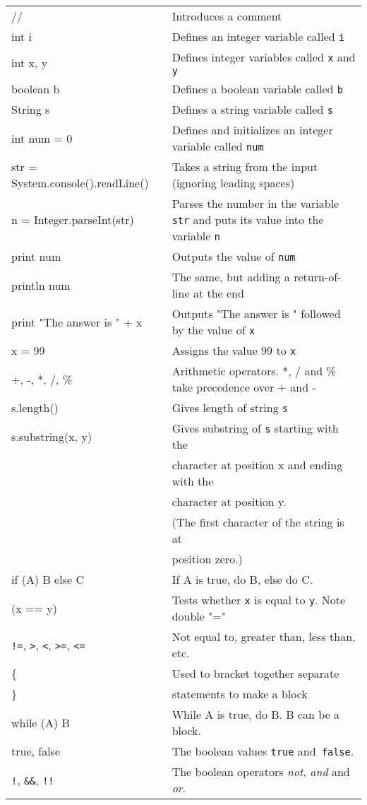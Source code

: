 
\begin{tabular}{p{6cm}p{7cm}}
// & Introduces a comment\\
int i & Defines an integer variable called \texttt{i}\\
int x, y & Defines integer variables called \texttt{x} and \texttt{y}\\
boolean b & Defines a boolean variable called \texttt{b}\\
String s & Defines a string variable called \texttt{s}\\
int num = 0 & Defines and initializes an integer variable called \texttt{num}\\
str = System.console().readLine() & Takes a string from the input
(ignoring leading spaces) \\
n = Integer.parseInt(str) & Parses the number in the variable
\texttt{str} and puts its value into the variable \texttt{n} \\
print num & Outputs the value of \texttt{num}\\
println num & The same, but adding a return-of-line at the end\\
print "The answer is " + x & Outputs "The answer is " followed by the value of \texttt{x}\\
x = 99 & Assigns the value 99 to \texttt{x}\\
+, -, *, /, \% & Arithmetic operators.  *, / and \% take precedence over + and -\\
s.length() & Gives length of string \texttt{s}\\
s.substring(x, y) & Gives substring of \texttt{s} starting with the \\
                  & character at position x and ending with the \\
                  & character at position y.\\
                  & (The first character of the string is at \\ 
                  & position zero.)\\
if (A) B else C   & If A is true, do B, else do C.\\
(x == y)          & Tests whether \texttt{x} is equal to \texttt{y}.  Note double "="\\
\verb+!=+, \verb+>+, \verb+<+, \verb+>=+, \verb+<=+ 
                  & Not equal to, greater than, less than, etc.\\
\{ & Used to bracket together separate \\ 
\} & statements to make a block\\
while (A) B & While A is true, do B.  B can be a block.\\
true, false & The boolean values \texttt{true} and\texttt{ false}.\\
\verb+!+, \verb+&&+, \verb+!!+  & The boolean operators \emph{not}, \emph{and} and \emph{or}.\\
\end{tabular}
\vspace*{5pt}



